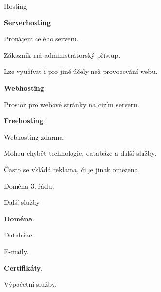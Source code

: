 \documentclass[aspectratio=169]{beamer}
\begin{document}
\begin{frame}{Hosting}
    \begin{multicols}{3}
        \centering

        \begin{cardTiny}
            \begin{flushleft}
                \textbf{Serverhosting}

                Pronájem celého serveru.

                Zákazník má administrátorský přístup.

                Lze využívat i pro jiné účely než provozování webu.
            \end{flushleft}
        \end{cardTiny}

        \begin{cardTiny}
            \begin{flushleft}
                \textbf{Webhosting}

                Prostor pro webové stránky na cizím serveru.
            \end{flushleft}
        \end{cardTiny}

        \begin{cardTiny}
            \begin{flushleft}
                \textbf{Freehosting}

                Webhosting zdarma.

                Mohou chybět technologie, databáze a další služby.

                Často se vkládá reklama, či je jinak omezena.

                Doména 3. řádu.
            \end{flushleft}
        \end{cardTiny}
    \end{multicols}
\end{frame}

\begin{frame}{Další služby}
    \begin{cardTiny}
        \begin{flushleft}
            \textbf{Doména}.

            Databáze.

            E-maily.

            \textbf{Certifikáty}.

            Výpočetní služby.
        \end{flushleft}
    \end{cardTiny}
\end{frame}
\end{document}
